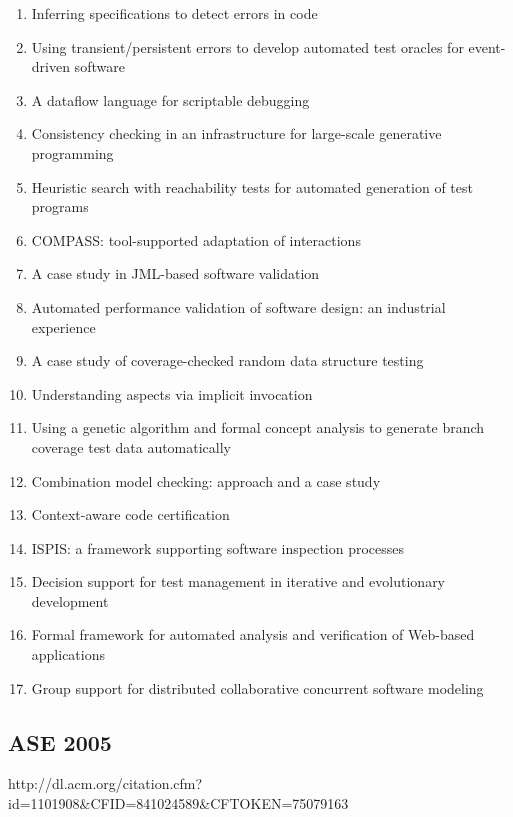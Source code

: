 \begin{enumerate}[itemsep=-1ex]
  \item Inferring specifications to detect errors in code
  \item Using transient/persistent errors to develop automated test oracles for event-driven software
  \item A dataflow language for scriptable debugging
  \item Consistency checking in an infrastructure for large-scale generative programming
  \item Heuristic search with reachability tests for automated generation of test programs
  \item COMPASS: tool-supported adaptation of interactions
  \item A case study in JML-based software validation
  \item Automated performance validation of software design: an industrial experience
  \item A case study of coverage-checked random data structure testing
  \item Understanding aspects via implicit invocation
  \item Using a genetic algorithm and formal concept analysis to generate branch coverage test data automatically
  \item Combination model checking: approach and a case study
  \item Context-aware code certification
  \item ISPIS: a framework supporting software inspection processes
  \item Decision support for test management in iterative and evolutionary development
  \item Formal framework for automated analysis and verification of Web-based applications 
  \item Group support for distributed collaborative concurrent software modeling
\end{enumerate}

\subsection{ASE 2005}

http://dl.acm.org/citation.cfm?id=1101908\&CFID=841024589\&CFTOKEN=75079163

